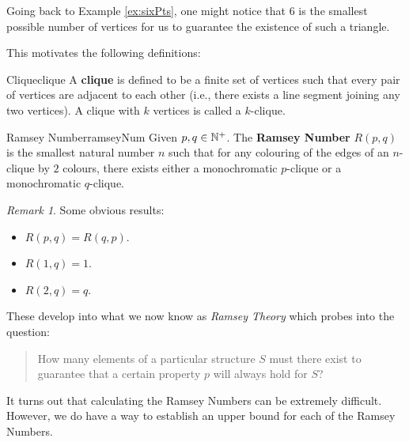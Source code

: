 \documentclass[math]{amznotes}
\theoremstyle{remark}
\newtheorem*{remark}{Remark}
\begin{document}
Going back to Example \ref{ex:sixPts}, one might notice that $6$ is the smallest possible number of vertices for us to guarantee the existence of such a triangle. 

This motivates the following definitions:
\begin{dfnbox}{Clique}{clique}
    A {\color{red} \textbf{clique}} is defined to be a finite set of vertices such that every pair of vertices are adjacent to each other (i.e., there exists a line segment joining any two vertices). A clique with $k$ vertices is called a $k$-clique.
\end{dfnbox}
\begin{dfnbox}{Ramsey Number}{ramseyNum}
    Given $p, q \in \mathbb{N}^+$. The {\color{red} \textbf{Ramsey Number}} $R(p, q)$ is the smallest natural number $n$ such that for any colouring of the edges of an $n$-clique by $2$ colours, there exists either a monochromatic $p$-clique or a monochromatic $q$-clique.
\end{dfnbox}
\begin{notebox}
    \begin{remark}
        Some obvious results:
        \begin{itemize}
            \item $R(p, q) = R(q, p)$.
            \item $R(1, q) = 1$.
            \item $R(2, q) = q$.
        \end{itemize}
    \end{remark}
\end{notebox}
These develop into what we now know as \textit{Ramsey Theory} which probes into the question:
\begin{quote}
    How many elements of a particular structure $S$ must there exist to guarantee that a certain property $p$ will always hold for $S$?
\end{quote}
It turns out that calculating the Ramsey Numbers can be extremely difficult. However, we do have a way to establish an upper bound for each of the Ramsey Numbers.
\end{document}
